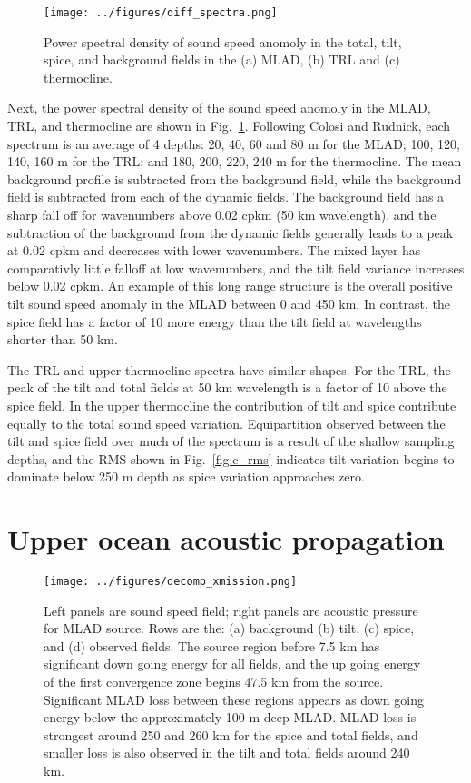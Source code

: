 \documentclass[preprint,NumberedRefs]{JASA}
\begin{document}
\begin{figure}
\texttt{[image: ../figures/diff\_spectra.png]}
        \caption{\label{fig:spectra}{Power spectral density of sound speed anomoly in the total, tilt, spice, and background fields in the (a) MLAD, (b) TRL and (c) thermocline.}}
\end{figure}
Next, the power spectral density of the sound speed anomoly in the MLAD, TRL, and thermocline are shown in Fig.~\ref{fig:spectra}. Following Colosi and Rudnick\cite{colosi2020observations}, each spectrum is an average of 4 depths: 20, 40, 60 and 80 m for the MLAD; 100, 120, 140, 160 m for the TRL; and 180, 200, 220, 240 m for the thermocline. The mean background profile is subtracted from the background field, while the background field is subtracted from each of the dynamic fields. The background field has a sharp fall off for wavenumbers above 0.02 cpkm (50 km wavelength), and the subtraction of the background from the dynamic fields generally leads to a peak at 0.02 cpkm and decreases with lower wavenumbers. The mixed layer has comparativly little falloff at low wavenumbers, and the tilt field variance increases below 0.02 cpkm. An example of this long range structure is the overall positive tilt sound speed anomaly in the MLAD between 0 and 450 km. In contrast, the spice field has a factor of 10 more energy than the tilt field at wavelengths shorter than 50 km.

The TRL and upper thermocline spectra have similar shapes. For the TRL, the peak of the tilt and total fields at 50 km wavelength is a factor of 10 above the spice field. In the upper thermocline the contribution of tilt and spice contribute equally to the total sound speed variation. Equipartition observed between the tilt and spice field over much of the spectrum is a result of the shallow sampling depths, and the RMS shown in Fig.~\ref{fig:c_rms} indicates tilt variation begins to dominate below 250 m depth as spice variation approaches zero.

\section{\label{sec:propagation}Upper ocean acoustic propagation}
\begin{figure}
\texttt{[image: ../figures/decomp\_xmission.png]}
    \caption{\label{fig:decomp_x}{Left panels are sound speed field; right panels are acoustic pressure for MLAD source. Rows are the: (a) background (b) tilt, (c) spice, and (d) observed fields. The source region before 7.5 km has significant down going energy for all fields, and the up going energy of the first convergence zone begins 47.5 km from the source. Significant MLAD loss between these regions appears as down going energy below the approximately 100 m deep MLAD. MLAD loss is strongest around 250 and 260 km for the spice and total fields, and smaller loss is also observed in the tilt and total fields around 240 km.}}
\end{figure}
\end{document}
